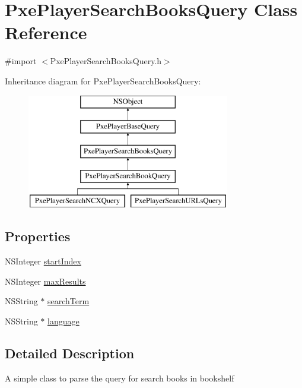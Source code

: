 \hypertarget{interface_pxe_player_search_books_query}{\section{Pxe\-Player\-Search\-Books\-Query Class Reference}
\label{interface_pxe_player_search_books_query}
}


{\ttfamily \#import $<$Pxe\-Player\-Search\-Books\-Query.\-h$>$}

Inheritance diagram for Pxe\-Player\-Search\-Books\-Query\-:\begin{figure}[H]
\begin{center}
\leavevmode
\includegraphics[height=5.000000cm]{interface_pxe_player_search_books_query}
\end{center}
\end{figure}
\subsection*{Properties}
\begin{DoxyCompactItemize}
\item 
N\-S\-Integer \hyperlink{interface_pxe_player_search_books_query_a860b999ef5a591e01872705e09ed871f}{start\-Index}
\item 
N\-S\-Integer \hyperlink{interface_pxe_player_search_books_query_aac159c61fed7fa6bb0c4a1a70a7637ce}{max\-Results}
\item 
N\-S\-String $\ast$ \hyperlink{interface_pxe_player_search_books_query_a417d9bda9b205c8d5727e163bcbc0e3b}{search\-Term}
\item 
N\-S\-String $\ast$ \hyperlink{interface_pxe_player_search_books_query_a46383e9d5bfcf7c45e5dd78b5bf71aea}{language}
\end{DoxyCompactItemize}


\subsection{Detailed Description}
A simple class to parse the query for search books in bookshelf 

